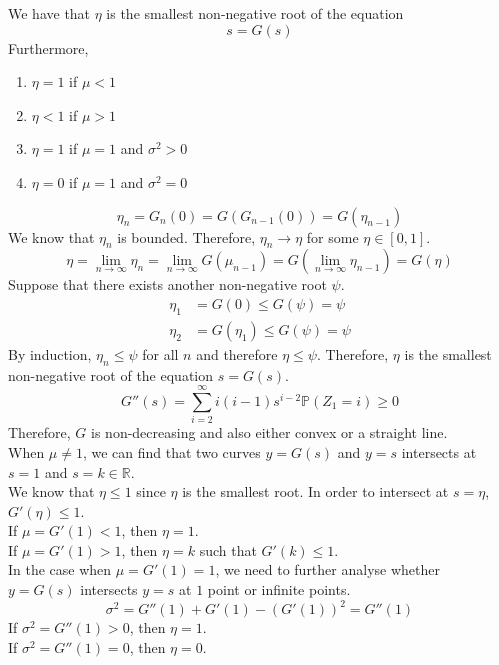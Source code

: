 \documentclass{huhtakm-template-book}
\newcommand{\prob}{\mathbb{P}}
\begin{document}
\newpage
\begin{thm}
	We have that $\eta$ is the smallest non-negative root of the equation
	\begin{equation*}
		s=G(s)
	\end{equation*}
	Furthermore,
	\begin{enumerate}
		\item $\eta=1$ if $\mu<1$
		\item $\eta<1$ if $\mu>1$
		\item $\eta=1$ if $\mu=1$ and $\sigma^{2}>0$
		\item $\eta=0$ if $\mu=1$ and $\sigma^{2}=0$
	\end{enumerate}
\end{thm}
\begin{proofing}
	\begin{equation*}
		\eta_{n}=G_{n}(0)=G(G_{n-1}(0))=G(\eta_{n-1})
	\end{equation*}
	We know that $\eta_{n}$ is bounded. Therefore, $\eta_{n}\to\eta$ for some $\eta\in[0,1]$.
	\begin{equation*}
		\eta=\lim_{n\to\infty}\eta_{n}=\lim_{n\to\infty}G(\mu_{n-1})=G\left(\lim_{n\to\infty}\eta_{n-1}\right)=G(\eta)
	\end{equation*}
	Suppose that there exists another non-negative root $\psi$.
	\begin{align*}
		\eta_{1}&=G(0)\leq G(\psi)=\psi\\
		\eta_{2}&=G(\eta_{1})\leq G(\psi)=\psi
	\end{align*}
	By induction, $\eta_{n}\leq\psi$ for all $n$ and therefore $\eta\leq\psi$. Therefore, $\eta$ is the smallest non-negative root of the equation $s=G(s)$.
	\begin{equation*}
		G''(s)=\sum_{i=2}^{\infty}i(i-1)s^{i-2}\prob(Z_{1}=i)\geq 0
	\end{equation*}
	Therefore, $G$ is non-decreasing and also either convex or a straight line.\\
	When $\mu\neq 1$, we can find that two curves $y=G(s)$ and $y=s$ intersects at $s=1$ and $s=k\in\mathbb{R}$.\\
	We know that $\eta\leq 1$ since $\eta$ is the smallest root. In order to intersect at $s=\eta$, $G'(\eta)\leq 1$.\\
	If $\mu=G'(1)<1$, then $\eta=1$.\\
	If $\mu=G'(1)>1$, then $\eta=k$ such that $G'(k)\leq 1$.\\
	In the case when $\mu=G'(1)=1$, we need to further analyse whether $y=G(s)$ intersects $y=s$ at $1$ point or infinite points.
	\begin{equation*}
		\sigma^{2}=G''(1)+G'(1)-(G'(1))^{2}=G''(1)
	\end{equation*}
	If $\sigma^{2}=G''(1)>0$, then $\eta=1$.\\
	If $\sigma^{2}=G''(1)=0$, then $\eta=0$.
\end{proofing}
\end{document}
